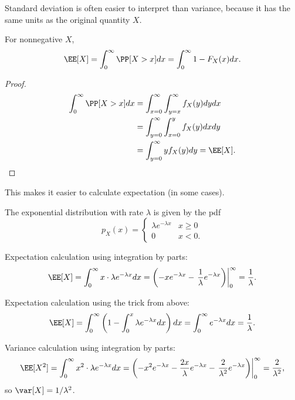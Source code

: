 Standard deviation is often easier to interpret than variance, because it has the same units as the original quantity $X$. 

\begin{theorem}
\lemlabel

For nonnegative $X$, 
\[\EE[X] = \int_{0}^{\infty} \PP[X > x]dx = \int_{0}^{\infty} 1 - F_X(x) dx.\]
\end{theorem}

\begin{proof}
    \begin{align*}
        \int_{0}^{\infty} \PP[X > x]dx &= \int_{x=0}^{\infty}\int_{y=x}^{\infty} f_X(y) dydx \\ 
        &= \int_{y=0}^{\infty}\int_{x=0}^y f_X(y) dxdy \\
        &= \int_{y=0}^{\infty} yf_X(y) dy = \EE[X].
    \end{align*}
\end{proof}

This makes it easier to calculate expectation (in some cases). 

\begin{example}
\exlabel

The \ac{exponential distribution} with rate $\lambda$ is given by the pdf 
\[p_X(x) = \begin{cases}\lambda e^{-\lambda x} & x\geq 0 \\ 0 & x < 0.\end{cases}\]
\end{example}

Expectation calculation using integration by parts: 
\[\EE[X] = \int_{0}^{\infty} x\cdot \lambda e^{-\lambda x}dx = \left(-xe^{-\lambda x} - \left.\frac{1}{\lambda}e^{-\lambda x}\right) \right\vert_{0}^{\infty} = \frac{1}{\lambda}.\]

Expectation calculation using the trick from above: 
\[\EE[X] = \int_{0}^{\infty}\left(1 - \int_{0}^{x}\lambda e^{-\lambda x}dx\right)dx = \int_{0}^{\infty} e^{-\lambda x}dx = \frac{1}{\lambda}.\]

Variance calculation using integration by parts: 
\[\EE[X^2] = \int_{0}^{\infty} x^2\cdot \lambda e^{-\lambda x}dx = \left(-x^2e^{-\lambda x} - \frac{2x}{\lambda}e^{-\lambda x} - \left.\frac{2}{\lambda^2}e^{-\lambda x}\right) \right\vert_{0}^{\infty} = \frac{2}{\lambda^2},\]
so $\var[X] = 1/\lambda^2$. 
